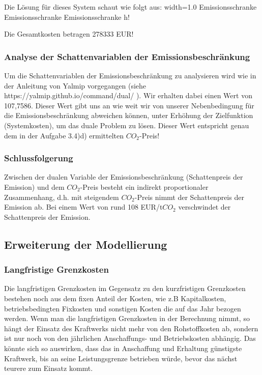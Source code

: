 \documentclass{eegreport}
\begin{document}
Die Lösung für dieses System schaut wie folgt aus: 
	{width=1.0\textwidth}
	{Emissionsschranke}
	{Emissionsschranke}
	{Emissionsschranke}
	{h!}

Die Gesamtkosten betragen 278333 EUR!
\subsubsection{Analyse der Schattenvariablen der Emissionsbeschränkung}
Um die Schattenvariablen der Emissionsbeschränkung zu analysieren wird wie in der Anleitung von Yalmip vorgegangen (siehe https://yalmip.github.io/command/dual/ ). Wir erhalten dabei einen Wert von 107,7586. Dieser Wert gibt uns an wie weit wir von unserer Nebenbedingung für die Emissionsbeschränkung abweichen können, unter Erhöhung der Zielfunktion (Systemkosten), um das duale Problem zu lösen. Dieser Wert entspricht genau dem in der Aufgabe 3.4)d) ermittelten $CO_2$-Preis! 

\subsubsection{Schlussfolgerung}
Zwischen der dualen Variable der Emissionsbeschränkung (Schattenpreis der Emission) und dem $CO_2$-Preis besteht ein indirekt proportionaler Zusammenhang, d.h. mit steigendem $CO_2$-Preis nimmt der Schattenpreis der Emission ab. Bei einem Wert von rund 108 EUR/t$CO_2$ verschwindet der Schattenpreis der Emission.

\newpage
\subsection{Erweiterung der Modellierung}

\subsubsection{Langfristige Grenzkosten}
Die langfristigen Grenzkosten im Gegensatz zu den kurzfristigen Grenzkosten bestehen noch aus dem fixen Anteil der Kosten, wie z.B  Kapitalkosten, betriebsbedingten Fixkosten und sonstigen Kosten die auf das Jahr bezogen werden.
Wenn man die langfristigen Grenzkosten in der Berechnung nimmt, so hängt der Einsatz
des Kraftwerks nicht mehr von den Rohstoffkosten ab, sondern ist nur noch von den jährlichen Anschaffungs- und
Betriebskosten abhängig.
Das könnte sich so auswirken, dass das in Anschaffung und Erhaltung günstigste
Kraftwerk, bis an seine Leistungsgrenze betrieben würde, bevor das nächst teurere zum Einsatz kommt.
\end{document}
